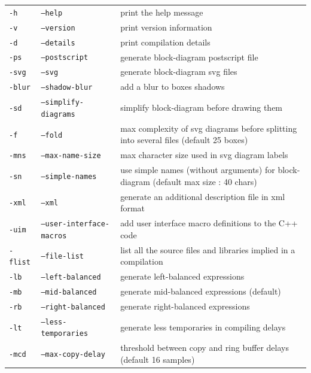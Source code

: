 \documentclass[a4paper]{book}
\begin{document}
\begin{supertabular}{|p{1.5cm}|p{4cm}|p{5cm}|}  
\texttt{-h} 				& \texttt{--help} 					& print the help message  \\
\texttt{-v} 				& \texttt{--version} 				& print version information  \\
\texttt{-d} 				& \texttt{--details} 				& print compilation details  \\
\texttt{-ps} 				& \texttt{--postscript} 			& generate block-diagram postscript file  \\
\texttt{-svg} 				& \texttt{--svg} 					& generate block-diagram svg files  \\
\texttt{-blur} 				& \texttt{--shadow-blur} 			& add a blur to boxes shadows  \\
\texttt{-sd} 				& \texttt{--simplify-diagrams} 		& simplify block-diagram before drawing them  \\
\texttt{-f } 		& \texttt{--fold }  		& max complexity of svg diagrams before splitting into several files (default 25 boxes)  \\
\texttt{-mns } 		& \texttt{--max-name-size } & max character size used in svg diagram labels\\
\texttt{-sn}             	& \texttt{--simple-names}			& use simple names (without arguments) for block-diagram (default max size : 40 chars) \\
\texttt{-xml} 				& \texttt{--xml} 					& generate an additional description file in xml format  \\
\texttt{-uim} 				& \texttt{--user-interface-macros} 	& add user interface macro definitions to the C++ code  \\
\texttt{-flist} 			& \texttt{--file-list} 				& list all the source files and libraries implied in a compilation  \\
\hline
\texttt{-lb}	 			& \texttt{--left-balanced} 			& generate left-balanced expressions  \\
\texttt{-mb} 				& \texttt{--mid-balanced} 			& generate mid-balanced expressions (default)  \\
\texttt{-rb} 				& \texttt{--right-balanced}			& generate right-balanced expressions  \\
\texttt{-lt} 				& \texttt{--less-temporaries}		& generate less temporaries in compiling delays  \\
\texttt{-mcd }		& \texttt{--max-copy-delay }& threshold between copy and ring buffer delays (default 16 samples)\\

\end{supertabular}
\end{document}

